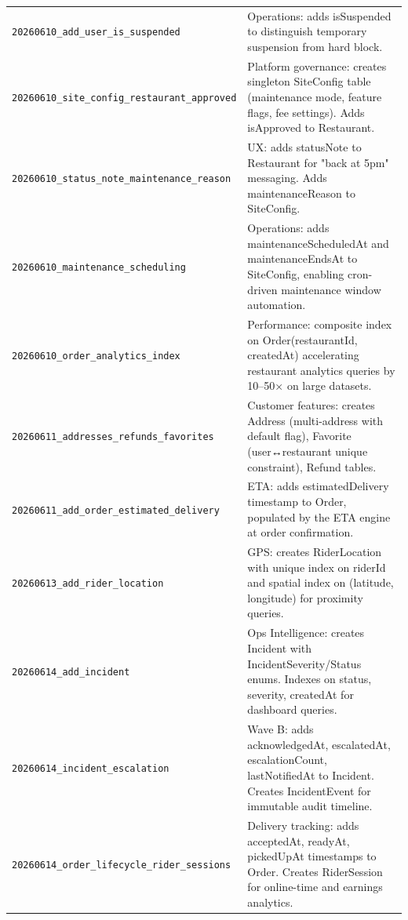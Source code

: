 \documentclass[11pt,a4paper,twoside]{book}
\begin{document}
\begin{center}
\begin{longtable}{p{5.5cm}p{7.5cm}}
\texttt{20260610\_add\_user\_is\_suspended} &
  Operations: adds isSuspended to distinguish temporary suspension from hard block. \\
\rowcolor{rowalt}\texttt{20260610\_site\_config\_restaurant\_approved} &
  Platform governance: creates singleton SiteConfig table (maintenance mode,
  feature flags, fee settings). Adds isApproved to Restaurant. \\
\texttt{20260610\_status\_note\_maintenance\_reason} &
  UX: adds statusNote to Restaurant for "back at 5pm" messaging.
  Adds maintenanceReason to SiteConfig. \\
\rowcolor{rowalt}\texttt{20260610\_maintenance\_scheduling} &
  Operations: adds maintenanceScheduledAt and maintenanceEndsAt to SiteConfig,
  enabling cron-driven maintenance window automation. \\
\texttt{20260610\_order\_analytics\_index} &
  Performance: composite index on Order(restaurantId, createdAt) accelerating
  restaurant analytics queries by 10–50× on large datasets. \\
\rowcolor{rowalt}\texttt{20260611\_addresses\_refunds\_favorites} &
  Customer features: creates Address (multi-address with default flag),
  Favorite (user↔restaurant unique constraint), Refund tables. \\
\texttt{20260611\_add\_order\_estimated\_delivery} &
  ETA: adds estimatedDelivery timestamp to Order, populated by the ETA engine
  at order confirmation. \\
\rowcolor{rowalt}\texttt{20260613\_add\_rider\_location} &
  GPS: creates RiderLocation with unique index on riderId and spatial index on
  (latitude, longitude) for proximity queries. \\
\texttt{20260614\_add\_incident} &
  Ops Intelligence: creates Incident with IncidentSeverity/Status enums.
  Indexes on status, severity, createdAt for dashboard queries. \\
\rowcolor{rowalt}\texttt{20260614\_incident\_escalation} &
  Wave B: adds acknowledgedAt, escalatedAt, escalationCount, lastNotifiedAt
  to Incident. Creates IncidentEvent for immutable audit timeline. \\
\texttt{20260614\_order\_lifecycle\_rider\_sessions} &
  Delivery tracking: adds acceptedAt, readyAt, pickedUpAt timestamps to Order.
  Creates RiderSession for online-time and earnings analytics. \\
\bottomrule
\end{longtable}
\end{center}
\end{document}
